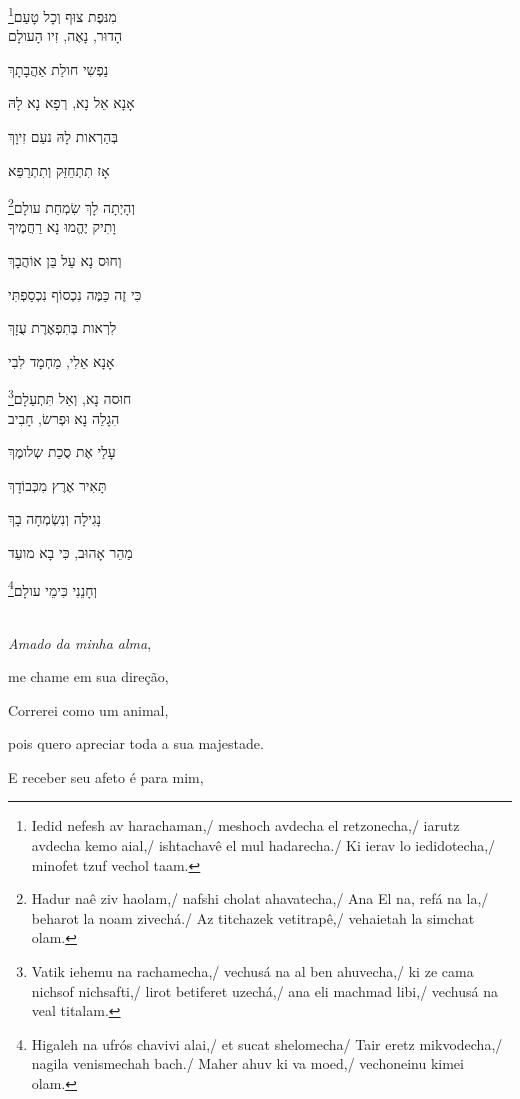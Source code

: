 מִנּפֶת צוּף וְכָל טָעַם\footnote{Iedid nefesh av harachaman,/ meshoch avdecha el retzonecha,/ iarutz avdecha kemo aial,/ ishtachavê el mul hadarecha./ Ki ierav lo iedidotecha,/ minofet tzuf vechol taam.}\\[10pt]

הָדוּר, נָאֶה, זִיו הָעולָם

נַפְשִי חולַת אַהֲבָתָךְ

אָנָא אֵל נָא, רְפָא נָא לָהּ

בְּהַרְאות לָהּ נעַם זִיוָךְ

אָז תִתְחֵזֵּק וְתִתְרַפֵּא

וְהָיְתָה לָךְ שִׂמְחַת עולָם\footnote{Hadur naê ziv haolam,/ nafshi cholat ahavatecha,/ Ana El na, refá na la,/ beharot la noam zivechá./ Az titchazek vetitrapê,/ vehaietah la simchat olam.}\\[10pt]

וָתִיק יֶהֱמוּ נָא רַחֲמֶיךָ

וְחוּס נָא עַל בֵּן אוֹהֲבָךְ

כִּי זֶה כַּמֶּה נִכְסוֹף נִכְסַפְתִּי

לִרְאות בְּתִפְאֶרֶת עֻזָךְ

אָנָא אֵלִי, מַחְמָד לִבִי

חוּסה נָא, וְאַל תִּתְעַלָם\footnote{Vatik iehemu na rachamecha,/
vechusá na al ben ahuvecha,/ ki ze cama nichsof nichsafti,/ lirot betiferet uzechá,/
ana eli machmad libi,/ vechusá na veal titalam.}\\[10pt]

הִגָלֵה נָא וּפְרשׂ, חָבִיב

עָלַי אֶת סֻכַת שְלומֶךְ

תָּאִיר אֶרֶץ מִכְּבוֹדָךְ

נָגִילָה וְנִשְׂמְחָה בָךְ

מַהֵר אָהוּב, כִּי בָא מועֵד

וְחָנֵנִי כִּימֵי עולָם\footnote{
Higaleh na ufrós chavivi alai,/
et sucat shelomecha/ Tair eretz mikvodecha,/ nagila venismechah bach./ Maher ahuv ki va moed,/
vechoneinu kimei olam.}

\movetooddpage
\raggedright

\textbf{}\\[15pt]

\emph{Amado da minha alma},

me chame em sua direção,

Correrei como um animal,

pois quero apreciar toda a sua majestade.

E receber seu afeto é para mim,

